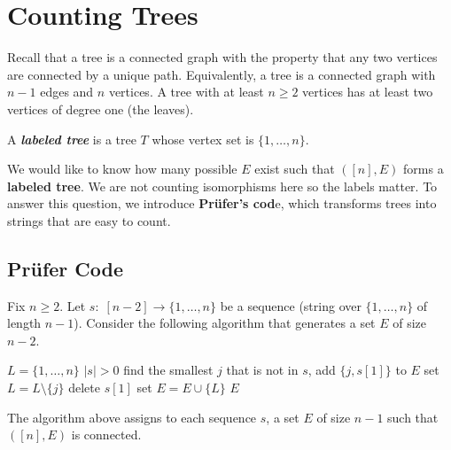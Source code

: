 



\section{Counting Trees}

Recall that a tree is a connected graph with the property that any two vertices are connected by a unique path. Equivalently, a tree is a connected graph with $n-1$ edges and $n$ vertices. A tree with at least $n \geq 2$ vertices has at least two vertices of degree one (the leaves).

\begin{definition}
    A \textit{\textbf{labeled tree}} is a tree $T$ whose vertex set is $\{1,\ldots,n\}$.
\end{definition}

We would like to know how many possible $E$ exist such that $([n], E)$ forms a \textbf{labeled tree}. We are not counting isomorphisms here so the labels matter. To answer this question, we introduce \textbf{Pr\"ufer's cod}e, which transforms trees into strings that are easy to count.

\subsection{Pr\"ufer Code}

Fix $n \geq 2$. Let $s:\; [n-2] \to \{1,\ldots,n\}$ be a sequence (string over $\{1,\ldots,n\}$ of length $n-1$). Consider the following algorithm that generates a set $E$ of size $n-2$.
\begin{codebox}
    \li $L = \{1,\ldots,n\}$
    \li \While $|s| > 0$ \Do
        \li find the smallest $j$ that is not in $s$, add $\{j,s[1]\}$ to $E$
        \li set $L = L \setminus \{j\}$
        \li delete $s[1]$
    \End
    \li set $E = E \cup \{L\}$
    \li \Return $E$
\end{codebox}
The algorithm above assigns to each sequence $s$, a set $E$ of size $n-1$ such that $([n], E)$ is connected.

